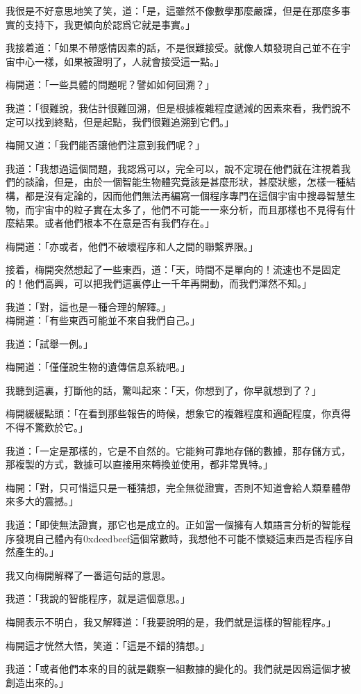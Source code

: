 我很是不好意思地笑了笑，道：「是，這雖然不像數學那麼嚴謹，但是在那麼多事實的支持下，我更傾向於認爲它就是事實。」

我接着道：「如果不帶感情因素的話，不是很難接受。就像人類發現自己並不在宇宙中心一樣，如果被證明了，人就會接受這一點。」

梅開道：「一些具體的問題呢？譬如如何回溯？」

我道：「很難說，我估計很難回溯，但是根據複雜程度遞減的因素來看，我們說不定可以找到終點，但是起點，我們很難追溯到它們。」

梅開又道：「我們能否讓他們注意到我們呢？」

我道：「我想過這個問題，我認爲可以，完全可以，說不定現在他們就在注視着我們的談論，但是，由於一個智能生物體究竟該是甚麼形狀，甚麼狀態，怎樣一種結構，都是沒有定論的，因而他們無法再編寫一個程序專門在這個宇宙中搜尋智慧生物，而宇宙中的粒子實在太多了，他們不可能一一來分析，而且那樣也不見得有什麼結果。或者他們根本不在意是否有我們存在。」

梅開道：「亦或者，他們不破壞程序和人之間的聯繫界限。」

接着，梅開突然想起了一些東西，道：「天，時間不是單向的！流速也不是固定的！他們高興，可以把我們這裏停止一千年再開動，而我們渾然不知。」

我道：「對，這也是一種合理的解釋。」
\\


梅開道：「有些東西可能並不來自我們自己。」

我道：「試舉一例。」

梅開道：「僅僅說生物的遺傳信息系統吧。」

我聽到這裏，打斷他的話，驚叫起來：「天，你想到了，你早就想到了？」

梅開緩緩點頭：「在看到那些報告的時候，想象它的複雜程度和適配程度，你真得不得不驚歎於它。」

我道：「一定是那樣的，它是不自然的。它能夠可靠地存儲的數據，那存儲方式，那複製的方式，數據可以直接用來轉換並使用，都非常異特。」

梅開：「對，只可惜這只是一種猜想，完全無從證實，否則不知道會給人類羣體帶來多大的震撼。」

我道：「即使無法證實，那它也是成立的。正如當一個擁有人類語言分析的智能程序發現自己體內有0xdeedbeef這個常數時，我想他不可能不懷疑這東西是否程序自然產生的。」


我又向梅開解釋了一番這句話的意思。

我道：「我說的智能程序，就是這個意思。」

梅開表示不明白，我又解釋道：「我要說明的是，我們就是這樣的智能程序。」

梅開這才恍然大悟，笑道：「這是不錯的猜想。」

我道：「或者他們本來的目的就是觀察一組數據的變化的。我們就是因爲這個才被創造出來的。」

